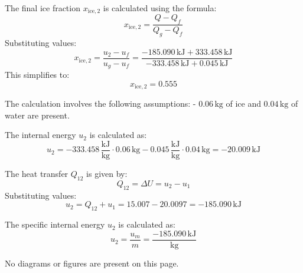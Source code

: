 The final ice fraction \( x_{\text{ice},2} \) is calculated using the formula:  
\[
x_{\text{ice},2} = \frac{Q - Q_f}{Q_g - Q_f}
\]  
Substituting values:  
\[
x_{\text{ice},2} = \frac{u_2 - u_f}{u_g - u_f} = \frac{-185.090 \, \text{kJ} + 333.458 \, \text{kJ}}{-333.458 \, \text{kJ} + 0.045 \, \text{kJ}}
\]  
This simplifies to:  
\[
x_{\text{ice},2} = 0.555
\]  

The calculation involves the following assumptions:  
- \( 0.06 \, \text{kg} \) of ice and \( 0.04 \, \text{kg} \) of water are present.  

The internal energy \( u_2 \) is calculated as:  
\[
u_2 = -333.458 \, \frac{\text{kJ}}{\text{kg}} \cdot 0.06 \, \text{kg} - 0.045 \, \frac{\text{kJ}}{\text{kg}} \cdot 0.04 \, \text{kg} = -20.009 \, \text{kJ}
\]  

The heat transfer \( Q_{12} \) is given by:  
\[
Q_{12} = \Delta U = u_2 - u_1
\]  
Substituting values:  
\[
u_2 = Q_{12} + u_1 = 15.007 - 20.0097 = -185.090 \, \text{kJ}
\]  

The specific internal energy \( u_2 \) is calculated as:  
\[
u_2 = \frac{u_m}{m} = \frac{-185.090 \, \text{kJ}}{\text{kg}}
\]  

No diagrams or figures are present on this page.